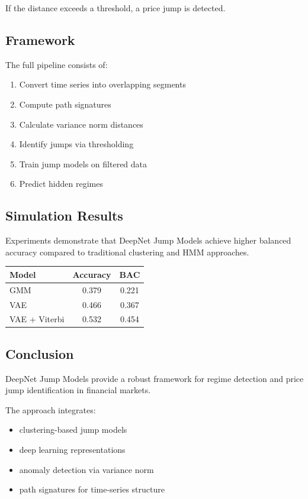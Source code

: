 \documentclass[11pt]{article}
\begin{document}
If the distance exceeds a threshold, a price jump is detected.

\subsection{Framework}

The full pipeline consists of:

\begin{enumerate}
\item Convert time series into overlapping segments
\item Compute path signatures
\item Calculate variance norm distances
\item Identify jumps via thresholding
\item Train jump models on filtered data
\item Predict hidden regimes
\end{enumerate}

\subsection{Simulation Results}

Experiments demonstrate that DeepNet Jump Models achieve
higher balanced accuracy compared to traditional clustering
and HMM approaches.

\begin{center}
\begin{tabular}{lcc}
\toprule
Model & Accuracy & BAC \\
\midrule
GMM & 0.379 & 0.221 \\
VAE & 0.466 & 0.367 \\
VAE + Viterbi & 0.532 & 0.454 \\
\bottomrule
\end{tabular}
\end{center}

\subsection{Conclusion}

DeepNet Jump Models provide a robust framework for regime detection
and price jump identification in financial markets.

The approach integrates:

\begin{itemize}
\item clustering-based jump models
\item deep learning representations
\item anomaly detection via variance norm
\item path signatures for time-series structure
\end{itemize}
\end{document}

